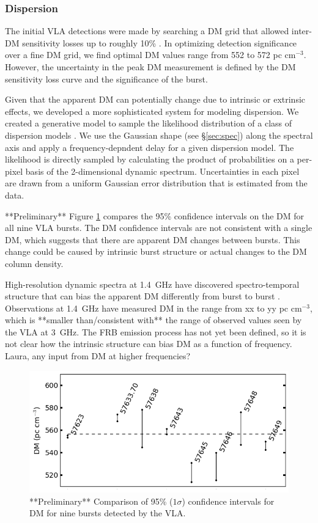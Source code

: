 \documentclass[twocolumn]{aastex61}
\begin{document}
\subsubsection{Dispersion}
The initial VLA detections were made by searching a DM grid that allowed inter-DM sensitivity losses up to roughly 10\% \citep[$\Delta DM=10 \rm{pc} \rm{cm}^{-3}$][]{2003ApJ...596.1142C}. In optimizing detection significance over a fine DM grid, we find optimal DM values range from 552 to 572 pc cm$^{-3}$. However, the uncertainty in the peak DM measurement is defined by the DM sensitivity loss curve and the significance of the burst. 

Given that the apparent DM can potentially change due to intrinsic or extrinsic effects, we developed a more sophisticated system for modeling dispersion. We created a generative model to sample the likelihood distribution of a class of dispersion models \citep{2010arXiv1008.4686H}. We use the Gaussian shape (see \S \ref{sec:spec}) along the spectral axis and apply a frequency-depndent delay for a given dispersion model. The likelihood is directly sampled by calculating the product of probabilities on a per-pixel basis of the 2-dimensional dynamic spectrum. Uncertainties in each pixel are drawn from a uniform Gaussian error distribution that is estimated from the data.

 **Preliminary** Figure \ref{fig:dmmodel} compares the 95\% confidence intervals on the DM for all nine VLA bursts. The DM confidence intervals are not consistent with a single DM, which suggests that there are apparent DM changes between bursts. This change could be caused by intrinsic burst structure or actual changes to the DM column density. 

High-resolution dynamic spectra at 1.4~GHz have discovered spectro-temporal structure that can bias the apparent DM differently from burst to burst \citep{WEIRD}. Observations at 1.4~GHz have measured DM in the range from xx to yy pc cm$^{-3}$, which is **smaller than/consistent with** the range of observed values seen by the VLA at 3~GHz. The FRB emission process has not yet been defined, so it is not clear how the intrinsic structure can bias DM as a function of frequency. {\color{red} Laura, any input from DM at higher frequencies?}

\begin{figure}[htb]
\begin{center}
\includegraphics[width=0.9\columnwidth]{dmmodel}
\caption{**Preliminary** Comparison of 95\% ($1\sigma$) confidence intervals for DM for nine bursts detected by the VLA.
\label{fig:dmmodel}}
\end{center}
\end{figure}
\end{document}
